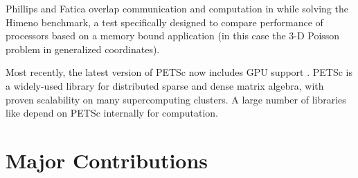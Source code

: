 \documentclass[11pt]{report}
\begin{document}
Phillips and Fatica overlap communication and computation in \cite{Phillips2010} while solving the Himeno benchmark, a test specifically designed to compare performance of processors based on a memory bound application (in this case the 3-D Poisson problem in generalized coordinates).  


Most recently, the latest version of PETSc now includes GPU support \cite{Minden2010,YokotaGPU2010}. PETSc is a widely-used library for distributed sparse and dense matrix algebra, with proven scalability on many supercomputing clusters. A large number of libraries like  depend on PETSc internally for computation. 





\section{Major Contributions}
\end{document}
